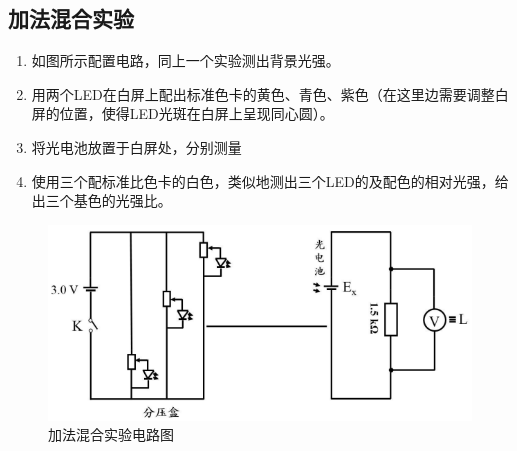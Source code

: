 \documentclass[UTF8]{ctexart}
\begin{document}
\subsection{加法混合实验}
\begin{enumerate}
    \item 如图所示配置电路，同上一个实验测出背景光强。
    \item 用两个LED在白屏上配出标准色卡的黄色、青色、紫色（在这里边需要调整白屏的位置，使得LED光斑在白屏上呈现同心圆）。
    \item 将光电池放置于白屏处，分别测量
    \item 使用三个配标准比色卡的白色，类似地测出三个LED的及配色的相对光强，给出三个基色的光强比。
\end{enumerate}
\begin{figure}[h]
    \centering
    \includegraphics[scale=1]{相对光强.PNG}
    \caption{加法混合实验电路图}
\end{figure}
\newpage
\end{document}
